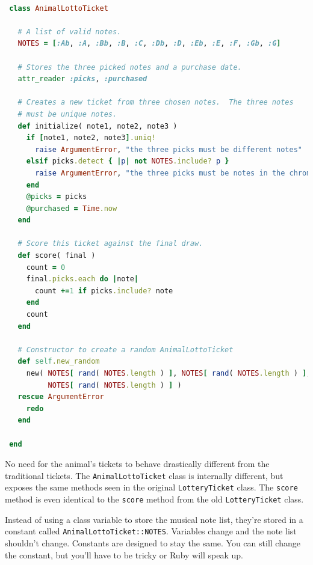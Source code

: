 \documentclass[10pt,twoside]{report}
\begin{document}
\begin{lstlisting}[basicstyle=\ttfamily\color{basiccolor},
    commentstyle = \ttfamily\color{commentcolor},
    keywordstyle=\ttfamily\color{keywordscolor},
    stringstyle=\color{stringcolor},
    language=Ruby,
    basicstyle=\small\ttfamily,
    showstringspaces=false,
  ]

 class AnimalLottoTicket

   # A list of valid notes.
   NOTES = [:Ab, :A, :Bb, :B, :C, :Db, :D, :Eb, :E, :F, :Gb, :G]

   # Stores the three picked notes and a purchase date.
   attr_reader :picks, :purchased

   # Creates a new ticket from three chosen notes.  The three notes
   # must be unique notes.
   def initialize( note1, note2, note3 )
     if [note1, note2, note3].uniq!
       raise ArgumentError, "the three picks must be different notes"
     elsif picks.detect { |p| not NOTES.include? p }
       raise ArgumentError, "the three picks must be notes in the chromatic scale."
     end
     @picks = picks
     @purchased = Time.now
   end

   # Score this ticket against the final draw.
   def score( final )
     count = 0
     final.picks.each do |note|
       count +=1 if picks.include? note
     end
     count
   end

   # Constructor to create a random AnimalLottoTicket
   def self.new_random
     new( NOTES[ rand( NOTES.length ) ], NOTES[ rand( NOTES.length ) ],
          NOTES[ rand( NOTES.length ) ] )
   rescue ArgumentError
     redo
   end

 end

\end{lstlisting}


No need for the animal's tickets to behave drastically different from
the traditional tickets.  The
\lstinline[breaklines=true]|AnimalLottoTicket| class is internally
different, but exposes the same methods seen in the original
\lstinline[breaklines=true]|LotteryTicket| class. The
\lstinline[breaklines=true]|score| method is even identical to the
\lstinline[breaklines=true]|score| method from the old
\lstinline[breaklines=true]|LotteryTicket| class.

Instead of using a class variable to store the musical note list,
they're stored in a constant called
\lstinline[breaklines=true]|AnimalLottoTicket::NOTES|.  Variables
change and the note list shouldn't change.  Constants are designed to
stay the same.  You can still change the constant, but you'll have to
be tricky or Ruby will speak up.
\end{document}
